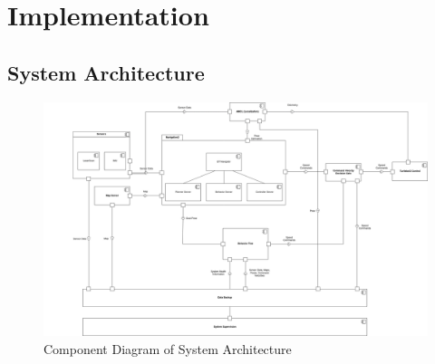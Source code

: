 \chapter{Implementation}
\label{cha:implementierung}

\section{System Architecture}
\begin{figure}
	\includegraphics[width=1.0\textwidth]{images/component_diagram_bt_architecture.png}
	\caption{Component Diagram of System Architecture}
\end{figure}

